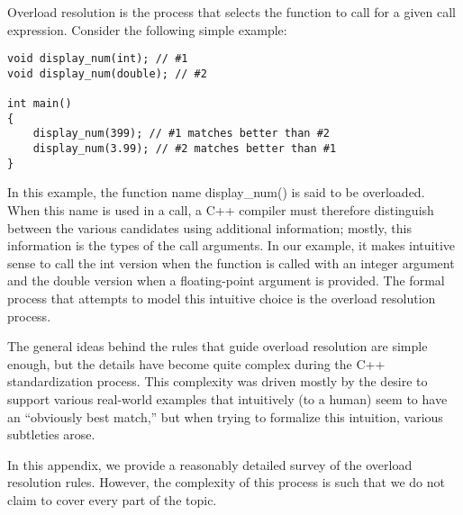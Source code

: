 Overload resolution is the process that selects the function to call for a given call expression. Consider the following simple example:

\begin{lstlisting}[style=styleCXX]
void display_num(int); // #1
void display_num(double); // #2

int main()
{
	display_num(399); // #1 matches better than #2
	display_num(3.99); // #2 matches better than #1
}
\end{lstlisting}

In this example, the function name display\_num() is said to be overloaded. When this name is used in a call, a C++ compiler must therefore distinguish between the various candidates using additional information; mostly, this information is the types of the call arguments. In our example, it makes intuitive sense to call the int version when the function is called with an integer argument and the double version when a floating-point argument is provided. The formal process that attempts to model this intuitive choice is the overload resolution process.

The general ideas behind the rules that guide overload resolution are simple enough, but the details have become quite complex during the C++ standardization process. This complexity was driven mostly by the desire to support various real-world examples that intuitively (to a human) seem to have an “obviously best match,” but when trying to formalize this intuition, various subtleties arose.

In this appendix, we provide a reasonably detailed survey of the overload resolution rules. However, the complexity of this process is such that we do not claim to cover every part of the topic.

























